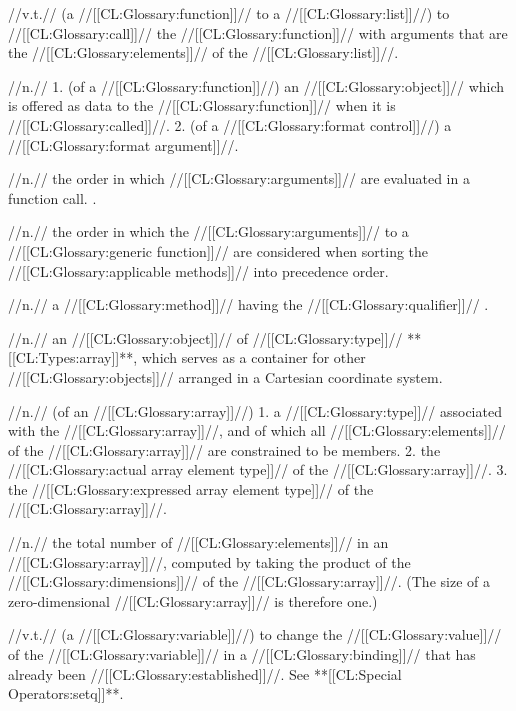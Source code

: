  //v.t.// (a //[[CL:Glossary:function]]// to a //[[CL:Glossary:list]]//) to //[[CL:Glossary:call]]// the //[[CL:Glossary:function]]// with arguments that are the //[[CL:Glossary:elements]]// of the //[[CL:Glossary:list]]//.  

 //n.// 1. (of a //[[CL:Glossary:function]]//) an //[[CL:Glossary:object]]// which is offered as data to the //[[CL:Glossary:function]]// when it is //[[CL:Glossary:called]]//.
 2. (of a //[[CL:Glossary:format control]]//) a //[[CL:Glossary:format argument]]//.

 //n.// the order in which //[[CL:Glossary:arguments]]// are evaluated in a function call.  \Seesection\Evaluation.

 //n.// the order in which the //[[CL:Glossary:arguments]]// to a //[[CL:Glossary:generic function]]// are considered when sorting the //[[CL:Glossary:applicable methods]]// into precedence order.

 //n.// a //[[CL:Glossary:method]]// having the //[[CL:Glossary:qualifier]]// .

 //n.// an //[[CL:Glossary:object]]// of //[[CL:Glossary:type]]// **[[CL:Types:array]]**, which serves as a container for other //[[CL:Glossary:objects]]// arranged in a Cartesian coordinate system.

 //n.// (of an //[[CL:Glossary:array]]//) 1. a //[[CL:Glossary:type]]// associated with the //[[CL:Glossary:array]]//, and of which all //[[CL:Glossary:elements]]// of the //[[CL:Glossary:array]]// are constrained to be members. 2. the //[[CL:Glossary:actual array element type]]// of the //[[CL:Glossary:array]]//. 3. the //[[CL:Glossary:expressed array element type]]// of the //[[CL:Glossary:array]]//.

 //n.// the total number of //[[CL:Glossary:elements]]// in an //[[CL:Glossary:array]]//, computed by taking the product of the //[[CL:Glossary:dimensions]]// of the //[[CL:Glossary:array]]//. (The size of a zero-dimensional //[[CL:Glossary:array]]// is therefore one.)

 //v.t.// (a //[[CL:Glossary:variable]]//) to change the //[[CL:Glossary:value]]// of the //[[CL:Glossary:variable]]// in a //[[CL:Glossary:binding]]// that has already been //[[CL:Glossary:established]]//. See **[[CL:Special Operators:setq]]**.

